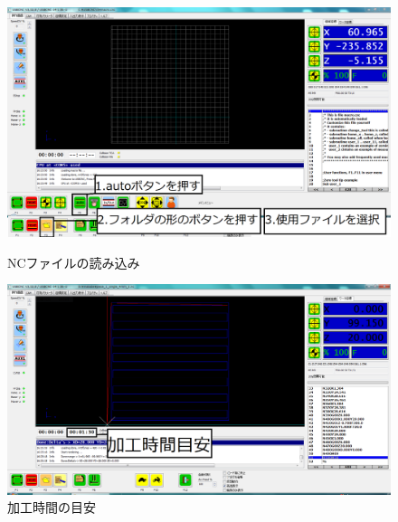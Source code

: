 \documentclass[b5paper, 9pt, twocolumn, titlepage,openany]{jsbook}%
\begin{document}
\begin{figure}[tbh]
  \begin{center}
    \begin{minipage}{0.8\columnwidth}
      \includegraphics[width=\columnwidth]{file_open.png}
    \end{minipage}
    \caption{NCファイルの読み込み\label{file_open}}
    \begin{minipage}{0.8\columnwidth}
      \includegraphics[width=\columnwidth]{file_open_after2.png}
    \end{minipage}
    \caption{加工時間の目安\label{after_open}}
  \end{center}
\end{figure}


\clearpage
\end{document}
